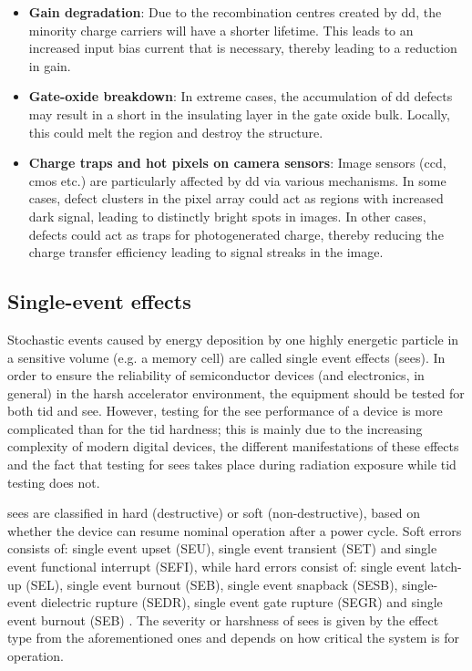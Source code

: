 \documentclass[encoding=utf8,british]{tumphthesis}
\begin{document}
\begin{itemize}
    \item \textbf{Gain degradation}: Due to the recombination centres created by \acrshort{dd}, the minority charge carriers will have a shorter lifetime. This leads to an increased input bias current that is necessary, thereby leading to a reduction in gain.

    \item \textbf{Gate-oxide breakdown}: In extreme cases, the accumulation of \acrshort{dd} defects may result in a short in the insulating layer in the gate oxide bulk. Locally, this could melt the region and destroy the structure.

    \item \textbf{Charge traps and hot pixels on camera sensors}: Image sensors (\acrshort{ccd}, \acrshort{cmos} etc.) are particularly affected by \acrshort{dd} via various mechanisms. In some cases, defect clusters in the pixel array could act as regions with increased dark signal, leading to distinctly bright spots in images. In other cases, defects could act as traps for photogenerated charge, thereby reducing the charge transfer efficiency leading to signal streaks in the image. 
\end{itemize}



\subsection{Single-event effects}
\label{sec:SEE}

Stochastic events caused by energy deposition by one highly energetic particle in a sensitive volume (e.g. a memory cell) are called single event effects (\acrshort{see}s). In order to ensure the reliability of semiconductor devices (and electronics, in general) in the harsh accelerator environment, the equipment should be tested for both \acrshort{tid} and \acrshort{see}. However, testing for the \acrshort{see} performance of a device is more complicated than for the \acrshort{tid} hardness; this is mainly due to the increasing complexity of modern digital devices, the different manifestations of these effects and the fact that testing for \acrshort{see}s takes place during radiation exposure while \acrshort{tid} testing does not.

\acrshort{see}s are classified in hard (destructive) or soft (non-destructive), based on whether the device can resume nominal operation after a power cycle. Soft errors consists of: single event upset (SEU), single event transient (SET) and single event functional interrupt (SEFI), while hard errors consist of: single event latch-up (SEL), single event burnout (SEB), single event snapback (SESB), single-event dielectric rupture (SEDR), single event gate rupture (SEGR) and single event burnout (SEB) \cite{osti_6042035}. The severity or harshness of \acrshort{see}s is given by the effect type from the aforementioned ones and depends on how critical the system is for operation. 
\end{document}

